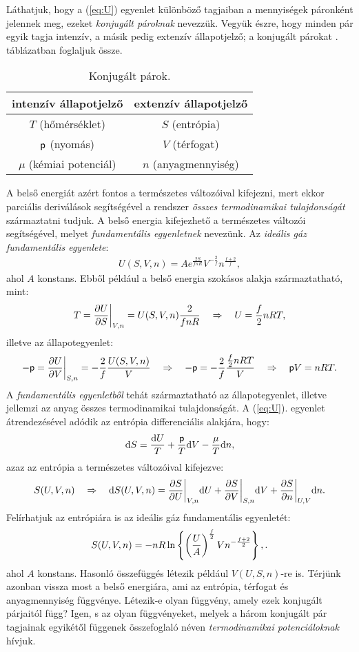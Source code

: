Láthatjuk, hogy a (\ref{eq:U}) egyenlet különböző tagjaiban a mennyiségek páronként jelennek meg, ezeket \emph{konjugált pároknak} nevezzük. Vegyük észre, hogy minden pár egyik tagja intenzív, a másik pedig extenzív állapotjelző; a konjugált párokat . táblázatban foglaljuk össze.
\begin{table}[htb]
\centering
\begin{tabular}{|c|c|} \hline
intenzív állapotjelző & extenzív állapotjelző\\ \hline\hline
$T$ (hőmérséklet) & $S$ (entrópia)\\ \hline
$\mathsf p$ (nyomás) & $V$ (térfogat)\\ \hline
$\mu$ (kémiai potenciál) & $n$ (anyagmennyiség) \\ \hline
\end{tabular}
\caption{Konjugált párok.}
\label{tab:konj}
\end{table}
A belső energiát azért fontos a természetes változóival kifejezni, mert ekkor parciális deriválások segítségével a rendszer \emph{összes termodinamikai tulajdonságát} származtatni tudjuk. A belső energia kifejezhető a természetes változói segítségével, melyet \emph{fundamentális egyenletnek} nevezünk. Az \emph{ideális gáz fundamentális egyenlete}:
\begin{align} \label{eq:U_fund}
	U(S,V,n) = A e^{\frac{2S}{fnR}}V^{-\frac 2f}n^{\frac{f+2}{f}},
\end{align}
ahol $A$ konstans. Ebből például a belső energia szokásos alakja származtatható, mint:
\begin{align}
	T = \frac{\partial{U}}{\partial{S}}\bigg|_{V,n} = U(S,V,n) \frac{2}{fnR} \quad\Rightarrow\quad U=\frac f2 nRT,
\end{align}
illetve az állapotegyenlet:
\begin{align}
	-\mathsf p = \frac{\partial{U}}{\partial{V}}\bigg|_{S,n} = -\frac 2f \frac{U(S,V,n)}{V} \quad\Rightarrow\quad -\mathsf p = -\frac 2f \frac{\frac f2 nRT}{V} \quad\Rightarrow\quad \mathsf p V = nRT.
\end{align}
A \emph{fundamentális egyenletből} tehát származtatható az állapotegyenlet, illetve jellemzi az anyag összes termodinamikai tulajdonságát. A (\ref{eq:U}). egyenlet átrendezésével adódik az entrópia differenciális alakjára, hogy:
\begin{align}
	\mathrm{d}S = \frac{\mathrm{d}U}{T} + \frac {\mathsf p} T \mathrm{d}V - \frac \mu T \mathrm{d}n,
\end{align}
azaz az entrópia a természetes változóival kifejezve:
\begin{align}
	S(U,V,n) \quad\Rightarrow\quad \mathrm{d}S(U,V,n) = \frac{\partial{S}}{\partial{U}}\bigg|_{V,n}\mathrm{d}U + \frac{\partial{S}}{\partial{V}} \bigg|_{S,n}\mathrm{d}V + \frac{\partial{S}}{\partial{n}}\bigg|_{U,V} \mathrm{d}n.
\end{align}
Felírhatjuk az entrópiára is az ideális gáz fundamentális egyenletét:
\begin{align}
	S(U,V,n) = -nR\ln\left\{{\left({\frac UA}\right)^{\frac f2}Vn^{{-\frac{f+2}{2}}}}\right\},.
\end{align}
ahol $A$ konstans. Hasonló összefüggés létezik például $V(U,S,n)$-re is. Térjünk azonban vissza most a belső energiára, ami az entrópia, térfogat és anyagmennyiség függvénye. Létezik-e olyan függvény, amely ezek konjugált párjaitól függ? Igen, s az olyan függvényeket, melyek a három konjugált pár tagjainak egyikétől függenek összefoglaló néven \emph{termodinamikai potenciáloknak} hívjuk.

